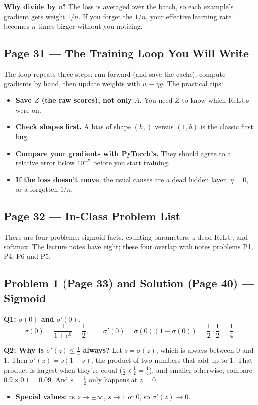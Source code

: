 \textbf{Why divide by $n$?} The loss is averaged over the batch, so each example's gradient gets weight $1/n$. If you forget the $1/n$, your effective learning rate becomes $n$ times bigger without you noticing.

\subsection*{Page 31 --- The Training Loop You Will Write}

The loop repeats three steps: run forward (and save the cache), compute gradients by hand, then update weights with $w - \eta g$. The practical tips:
\begin{itemize}[leftmargin=*]
  \item \textbf{Save $Z$ (the raw scores), not only $A$.} You need $Z$ to know which ReLUs were on.
  \item \textbf{Check shapes first.} A bias of shape $(h,)$ versus $(1, h)$ is the classic first bug.
  \item \textbf{Compare your gradients with PyTorch's.} They should agree to a relative error below $10^{-5}$ before you start training.
  \item \textbf{If the loss doesn't move}, the usual causes are a dead hidden layer, $\eta = 0$, or a forgotten $1/n$.
\end{itemize}

\subsection*{Page 32 --- In-Class Problem List}

There are four problems: sigmoid facts, counting parameters, a dead ReLU, and softmax. The lecture notes have eight; these four overlap with notes problems P1, P4, P6 and P5.

\subsection*{Problem 1 (Page 33) and Solution (Page 40) --- Sigmoid}

\textbf{Q1: $\sigma(0)$ and $\sigma'(0)$.}
\[
\sigma(0) = \frac{1}{1 + e^{0}} = \frac12, \qquad \sigma'(0) = \sigma(0)\left(1 - \sigma(0)\right) = \frac12 \cdot \frac12 = \frac14
\]

\textbf{Q2: Why is $\sigma'(z) \le \tfrac14$ always?}
Let $s = \sigma(z)$, which is always between 0 and 1. Then $\sigma'(z) = s(1-s)$, the product of two numbers that add up to 1. That product is largest when they're equal ($\tfrac12 \times \tfrac12 = \tfrac14$), and smaller otherwise; compare $0.9 \times 0.1 = 0.09$. And $s = \tfrac12$ only happens at $z = 0$.
\begin{itemize}[leftmargin=*]
  \item \textbf{Special values:} as $z \to \pm\infty$, $s \to 1$ or $0$, so $\sigma'(z) \to 0$.
\end{itemize}

